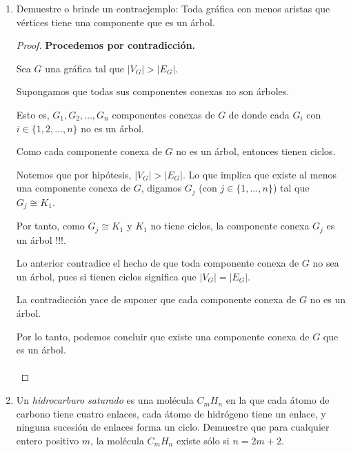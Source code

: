 \documentclass{article}
\begin{document}
\begin{enumerate}
    \item Demuestre o brinde un contraejemplo: Toda
      gr\'afica con menos aristas que v\'ertices tiene
      una componente que es un \'arbol.

      \renewcommand\qedsymbol{QED}
      \begin{proof}
        \textbf{Procedemos por contradicción.}

        Sea $G$ una gráfica tal que $|V_{G}| > |E_{G}|$.

        Supongamos que todas sus componentes conexas no son árboles.

        Esto es, $G_{1}, G_{2}, \dots, G_{n}$ componentes conexas de $G$ de donde
        cada $G_{i}$ con $i \in  \{1, 2, \dots, n\}$ no es un árbol.

        Como cada componente conexa de $G$ no es un árbol, entonces tienen
        ciclos.

        Notemos que por hipótesis, $|V_{G}| > |E_{G}|$. Lo que implica que existe
        al menos una componente conexa de $G$, digamos $G_{j}$ (con
        $j \in \{1, \dots, n\}$) tal que $G_{j} \cong K_{1}$.

        Por tanto, como $G_{j} \cong K_{1}$ y $K_{1}$ no tiene ciclos, la componente
        conexa $G_{j}$ es un árbol !!!.

        Lo anterior contradice el hecho de que toda componente conexa de $G$ no
        sea un árbol, pues si tienen ciclos significa que $|V_{G}| = |E_{G}|$.

        La contradicción yace de suponer que cada componente conexa de $G$ no es un
        árbol.

        Por lo tanto, podemos concluir que existe una componente conexa de $G$ que
        es un árbol. \\
        \\
      \end{proof}

    \item Un {\em hidrocarburo saturado} es una
      mol\'ecula $C_mH_n$ en la que cada \'atomo de
      carbono tiene cuatro enlaces, cada
      \'atomo de hidr\'ogeno tiene un enlace, y
      ninguna sucesi\'on de enlaces forma un ciclo.
      Demuestre que para cualquier entero positivo
      $m$, la mol\'ecula $C_mH_n$ existe s\'olo si
      $n = 2m + 2$.


\end{enumerate}
\end{document}
